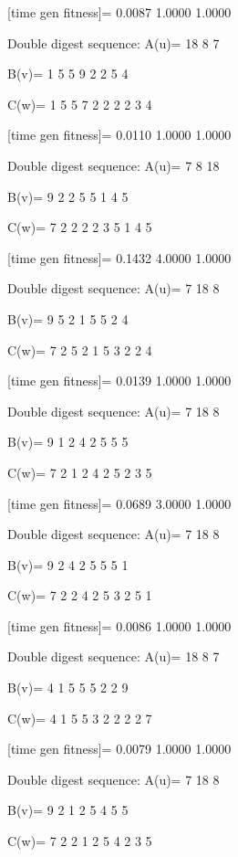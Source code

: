 [time gen fitness]=
    0.0087    1.0000    1.0000

Double digest sequence:
A(u)=
    18     8     7

B(v)=
     1     5     5     9     2     2     5     4

C(w)=
     1     5     5     7     2     2     2     2     3     4

[time gen fitness]=
    0.0110    1.0000    1.0000

Double digest sequence:
A(u)=
     7     8    18

B(v)=
     9     2     2     5     5     1     4     5

C(w)=
     7     2     2     2     2     3     5     1     4     5

[time gen fitness]=
    0.1432    4.0000    1.0000

Double digest sequence:
A(u)=
     7    18     8

B(v)=
     9     5     2     1     5     5     2     4

C(w)=
     7     2     5     2     1     5     3     2     2     4

[time gen fitness]=
    0.0139    1.0000    1.0000

Double digest sequence:
A(u)=
     7    18     8

B(v)=
     9     1     2     4     2     5     5     5

C(w)=
     7     2     1     2     4     2     5     2     3     5

[time gen fitness]=
    0.0689    3.0000    1.0000

Double digest sequence:
A(u)=
     7    18     8

B(v)=
     9     2     4     2     5     5     5     1

C(w)=
     7     2     2     4     2     5     3     2     5     1

[time gen fitness]=
    0.0086    1.0000    1.0000

Double digest sequence:
A(u)=
    18     8     7

B(v)=
     4     1     5     5     5     2     2     9

C(w)=
     4     1     5     5     3     2     2     2     2     7

[time gen fitness]=
    0.0079    1.0000    1.0000

Double digest sequence:
A(u)=
     7    18     8

B(v)=
     9     2     1     2     5     4     5     5

C(w)=
     7     2     2     1     2     5     4     2     3     5

